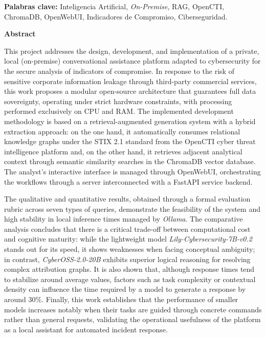 \documentclass[12pt]{report}
\begin{document}
\noindent \textbf{Palabras clave:} Inteligencia Artificial, \textit{On-Premise}, RAG, OpenCTI, ChromaDB, OpenWebUI, Indicadores de Compromiso, Ciberseguridad.
\
\newpage
{}
\begin{center}
	\textbf{Abstract}
\end{center}
	\noindent This project addresses the design, development, and implementation of a private, local (on-premise) conversational assistance platform adapted to cybersecurity for the secure analysis of indicators of compromise. In response to the risk of sensitive corporate information leakage through third-party commercial services, this work proposes a modular open-source architecture that guarantees full data sovereignty, operating under strict hardware constraints, with processing performed exclusively on CPU and RAM. The implemented development methodology is based on a retrieval-augmented generation system with a hybrid extraction approach: on the one hand, it automatically consumes relational knowledge graphs under the STIX 2.1 standard from the OpenCTI cyber threat intelligence platform and, on the other hand, it retrieves adjacent analytical context through semantic similarity searches in the ChromaDB vector database. The analyst's interactive interface is managed through OpenWebUI, orchestrating the workflows through a server interconnected with a FastAPI service backend.

	The qualitative and quantitative results, obtained through a formal evaluation rubric across seven types of queries, demonstrate the feasibility of the system and high stability in local inference times managed by \textit{Ollama}. The comparative analysis concludes that there is a critical trade-off between computational cost and cognitive maturity: while the lightweight model \textit{Lily-Cybersecurity-7B-v0.2} stands out for its speed, it shows weaknesses when facing conceptual ambiguity; in contrast, \textit{CyberOSS-2.0-20B} exhibits superior logical reasoning for resolving complex attribution graphs. It is also shown that, although response times tend to stabilize around average values, factors such as task complexity or contextual density can influence the time required by a model to generate a response by around 30\%. Finally, this work establishes that the performance of smaller models increases notably when their tasks are guided through concrete commands rather than general requests, validating the operational usefulness of the platform as a local assistant for automated incident response.
\vspace{1.5em}
	
\end{document}
